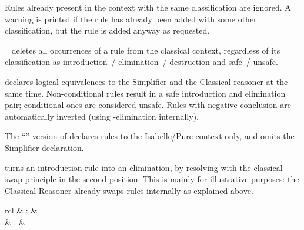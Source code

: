 \begin{isabellebody}
\begin{isamarkuptext}
\begin{description}
  Rules already present in the context with the same classification
  are ignored.  A warning is printed if the rule has already been
  added with some other classification, but the rule is added anyway
  as requested.

  \item \hyperlink{attribute.rule}{\mbox{}}~ deletes all occurrences of a
  rule from the classical context, regardless of its classification as
  introduction~/ elimination~/ destruction and safe~/ unsafe.

  \item \hyperlink{attribute.iff}{\mbox{}} declares logical equivalences to the
  Simplifier and the Classical reasoner at the same time.
  Non-conditional rules result in a safe introduction and elimination
  pair; conditional ones are considered unsafe.  Rules with negative
  conclusion are automatically inverted (using -elimination
  internally).

  The ``'' version of \hyperlink{attribute.iff}{\mbox{}} declares rules to
  the Isabelle/Pure context only, and omits the Simplifier
  declaration.

  \item \hyperlink{attribute.swapped}{\mbox{}} turns an introduction rule into an
  elimination, by resolving with the classical swap principle  in the second position.  This is mainly for
  illustrative purposes: the Classical Reasoner already swaps rules
  internally as explained above.

  \end{description}%
\end{isamarkuptext}%
\isamarkuptrue%
%
\isamarkuptrue%
%
\begin{isamarkuptext}%
\begin{matharray}{rcl}
    \hypertarget{method.rule}{\hyperlink{method.rule}{\mbox{}}} & : &  \\
    \hypertarget{method.contradiction}{\hyperlink{method.contradiction}{\mbox{}}} & : &  \\
  \end{matharray}


\end{isamarkuptext}
\end{isabellebody}
